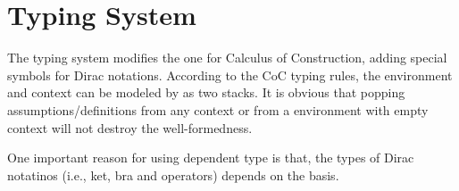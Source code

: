 \documentclass{article}
\newcommand{\yx}[1]{\textit{\color{blue}[YX] : #1}}
\begin{document}






\clearpage
\section{Typing System}
The typing system modifies the one for Calculus of Construction, adding special symbols for Dirac notations.
According to the CoC typing rules, the environment and context can be modeled by as two stacks. It is obvious that popping assumptions/definitions from any context or from a environment with empty context will not destroy the well-formedness.

One important reason for using dependent type is that, the types of Dirac notatinos (i.e., ket, bra and operators) depends on the basis.

\newcommand{\reduce}{\triangleright}

\newcommand{\Sort}{\mathsf{Sort}}
\newcommand{\WF}{\mathcal{WF}}
\newcommand{\Type}{\mathsf{Type}}
\newcommand{\BaseS}{\mathsf{Base}}


\newcommand{\SType}{\mathcal{S}}
\newcommand{\KType}{\mathcal{K}}
\newcommand{\BType}{\mathcal{B}}
\newcommand{\OType}{\mathcal{O}}

\newcommand{\ZEROK}{\mathbf{0}_\mathcal{K}}
\newcommand{\ZEROB}{\mathbf{0}_\mathcal{B}}
\newcommand{\ZEROO}{\mathbf{0}_\mathcal{O}}
\newcommand{\ONEO}{\mathbf{1}_\mathcal{O}}
\end{document}
